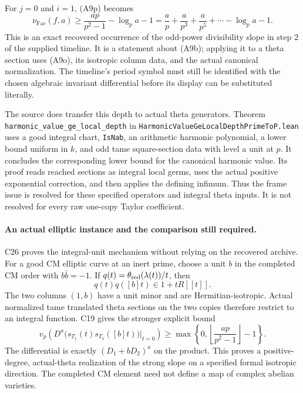 \documentclass[11pt]{article}
\theoremstyle{definition}\newtheorem{definition}[theorem]{Definition}\newtheorem{remark}[theorem]{Remark}
\begin{document}
For $j=0$ and $i=1$, (A9p) becomes
\[
 \nu_{\mathrm{Fac}}(f,a)
       \geq \frac{ap}{p^2-1}-\log_p a-1
       =\frac ap+\frac a{p^3}+\frac a{p^5}+\cdots
                                      -\log_p a-1.
 \tag{A9r}
\]
This is an exact recovered occurrence of the odd-power
divisibility slope in step 2 of the supplied timeline.
It is a statement about (A9b); applying it to a theta
section uses (A9o), its isotropic column data, and the
actual canonical normalization.
The timeline's period symbol must still be identified with
the chosen algebraic invariant differential before its
display can be substituted literally.

The source does transfer this depth to actual theta
generators.  Theorem
\nolinkurl{harmonic_value_ge_local_depth} in
\nolinkurl{HarmonicValueGeLocalDepthPrimeToP.lean}
uses a good integral chart, \texttt{IsNab}, an arithmetic
harmonic polynomial, a lower bound uniform in $k$, and
odd tame square-section data with level a unit at $p$.
It concludes the corresponding lower bound for the
canonical harmonic value.  Its proof reads reached
sections as integral local germs, uses the actual positive
exponential correction, and then applies the defining
infimum.  Thus the frame issue is resolved for these
specified operators and integral theta inputs.  It is
not resolved for every raw one-copy Taylor coefficient.

\paragraph{An actual elliptic instance and the comparison still required.}
C26 proves the integral-unit mechanism without relying on
the recovered archive.  For a good CM elliptic curve at an
inert prime, choose a unit $b$ in the completed CM order with
$b\bar b=-1$.  If $q(t)=\theta_{\rm red}(\lambda(t))/t$, then
\[
                 q(t)q([b]t)\in1+tR[[t]].
 \tag{A9s}
\]
The two columns $(1,b)$ have a unit minor and are
Hermitian-isotropic.  Actual normalized tame translated
theta sections on the two copies therefore restrict to an
integral function.  C19 gives the stronger explicit bound
\[
 v_p\!\left(D^a
    \bigl(s_{T_1}(t)s_{T_2}([b]t)\bigr)\big|_{t=0}\right)
   \geq
   \max\left\{0,\left\lfloor\frac{ap}{p^2-1}\right\rfloor-1\right\}.
 \tag{A9t}
\]
The differential is exactly $(D_1+bD_2)^a$ on the product.
This proves a positive-degree, actual-theta realization of
the strong slope on a specified formal isotropic direction.
The completed CM element need not define a map of complex
abelian varieties.
\end{document}

